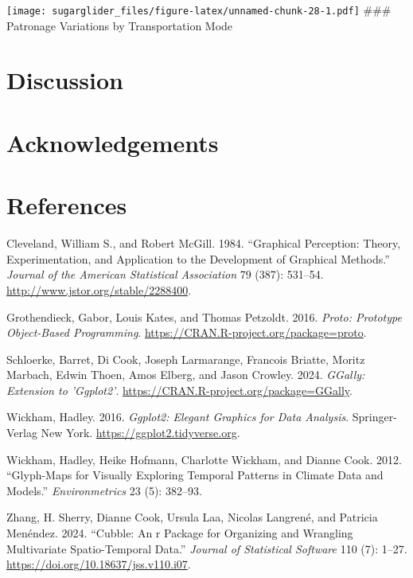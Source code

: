 \texttt{[image: sugarglider\_files/figure-latex/unnamed-chunk-28-1.pdf]}
\#\#\# Patronage Variations by Transportation Mode

\hypertarget{discussion}{%
\section{Discussion}\label{discussion}}

\hypertarget{acknowledgements}{%
\section{Acknowledgements}\label{acknowledgements}}

\hypertarget{references}{%
\section*{References}\label{references}}

\hypertarget{refs}{}
\begin{CSLReferences}{1}{0}
\leavevmode{}%
Cleveland, William S., and Robert McGill. 1984. {``Graphical Perception: Theory, Experimentation, and Application to the Development of Graphical Methods.''} \emph{Journal of the American Statistical Association} 79 (387): 531--54. \url{http://www.jstor.org/stable/2288400}.

\leavevmode{}%
Grothendieck, Gabor, Louis Kates, and Thomas Petzoldt. 2016. \emph{Proto: Prototype Object-Based Programming}. \url{https://CRAN.R-project.org/package=proto}.

\leavevmode{}%
Schloerke, Barret, Di Cook, Joseph Larmarange, Francois Briatte, Moritz Marbach, Edwin Thoen, Amos Elberg, and Jason Crowley. 2024. \emph{GGally: Extension to 'Ggplot2'}. \url{https://CRAN.R-project.org/package=GGally}.

\leavevmode{}%
Wickham, Hadley. 2016. \emph{Ggplot2: Elegant Graphics for Data Analysis}. Springer-Verlag New York. \url{https://ggplot2.tidyverse.org}.

\leavevmode{}%
Wickham, Hadley, Heike Hofmann, Charlotte Wickham, and Dianne Cook. 2012. {``Glyph-Maps for Visually Exploring Temporal Patterns in Climate Data and Models.''} \emph{Environmetrics} 23 (5): 382--93.

\leavevmode{}%
Zhang, H. Sherry, Dianne Cook, Ursula Laa, Nicolas Langrené, and Patricia Menéndez. 2024. {``Cubble: An r Package for Organizing and Wrangling Multivariate Spatio-Temporal Data.''} \emph{Journal of Statistical Software} 110 (7): 1--27. \url{https://doi.org/10.18637/jss.v110.i07}.

\end{CSLReferences}


